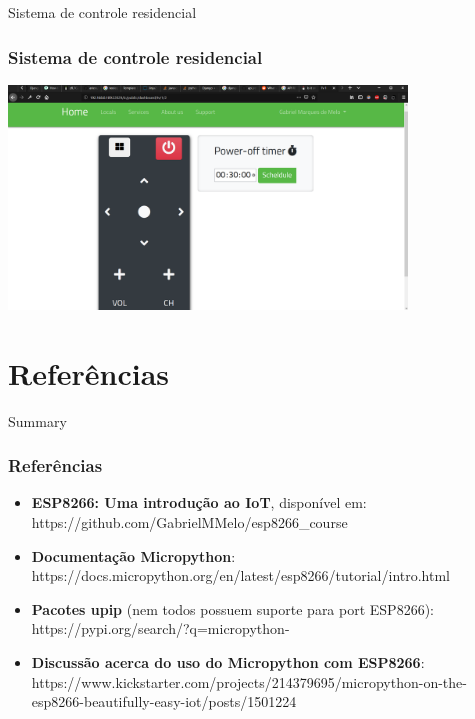 \documentclass[10pt, compress]{beamer}
\begin{document}
\begin{frame}{Sistema de controle residencial}
  \frametitle{Sistema de controle residencial}
  \begin{center}
    \includegraphics[width=300pt]{images/iot-server_remotecontrol.png}
  \end{center}
\end{frame}
\section{Referências}

\begin{frame}{Summary}
  \frametitle{Referências}
  \vspace{15pt}
  \begin{itemize}
    \item \textbf{ESP8266: Uma introdução ao IoT}, disponível em: https://github.com/GabrielMMelo/esp8266\_course \vspace{15pt}
    \item \textbf{Documentação Micropython}: https://docs.micropython.org/en/latest/esp8266/tutorial/intro.html \vspace{5pt}
    \item \textbf{Pacotes upip} (nem todos possuem suporte para port ESP8266): https://pypi.org/search/?q=micropython- \vspace{15pt}
    \item \textbf{Discussão acerca do uso do Micropython com ESP8266}: https://www.kickstarter.com/projects/214379695/micropython-on-the-esp8266-beautifully-easy-iot/posts/1501224 \vspace{5pt}
  \end{itemize}
\end{frame}

\end{document}
